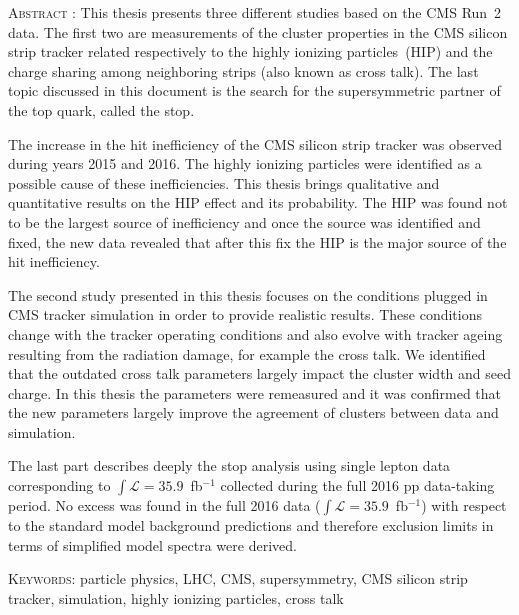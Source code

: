 \vspace*{-1.0cm}
\begin{framed}
    \vspace*{-0.3cm}


\textsc{Abstract} : This thesis presents three different studies based on the CMS Run~2 data. The first two are measurements of the cluster properties in the CMS silicon strip tracker related respectively to the highly ionizing particles~(HIP) and the charge sharing among neighboring strips (also known as cross talk). The last topic discussed in this document is the search for the supersymmetric partner of the top quark, called the stop.

The increase in the hit inefficiency of the CMS silicon strip tracker was observed during years 2015 and 2016. The highly ionizing particles were identified as a possible cause of these inefficiencies. This thesis brings qualitative and quantitative results on the HIP effect and its probability. The HIP was found not to be the largest source of inefficiency and once the source was identified and fixed, the new data revealed that after this fix the HIP is the major source of the hit inefficiency.

The second study presented in this thesis focuses on the conditions plugged in CMS tracker simulation in order to provide realistic results. These conditions change with the tracker operating conditions and also evolve with tracker ageing resulting from the radiation damage, for example the cross talk. We identified that the outdated cross talk parameters largely impact the cluster width and seed charge. In this thesis the parameters were remeasured and it was confirmed that the new parameters largely improve the agreement of clusters between data and simulation.

The last part describes deeply the stop analysis using single lepton data corresponding to $\int{\mathcal{L}}= 35.9$~fb$^{-1}$ collected during the full 2016 pp data-taking period. No excess was found in the full 2016 data ($\int{\mathcal{L}}=35.9$~fb$^{-1}$) with respect to the standard model background predictions and therefore exclusion limits in terms of simplified model spectra were derived.

    \textsc{Keywords}: particle physics, LHC, CMS, supersymmetry, CMS silicon strip tracker, simulation, highly ionizing particles, cross talk
\end{framed}
